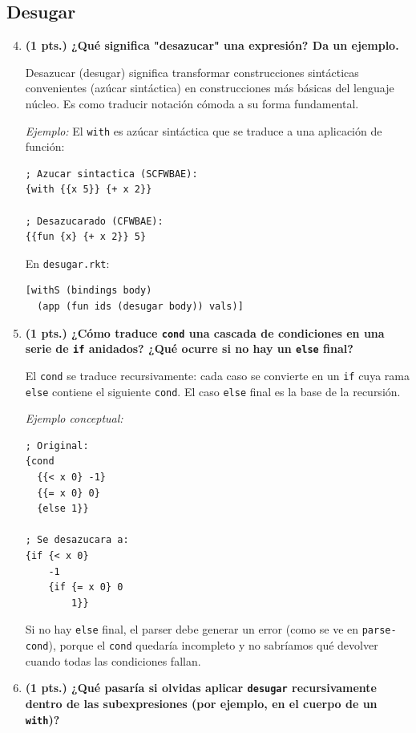 \documentclass[12pt,letterpaper]{article}
\begin{document}
\subsection{Desugar}

\begin{enumerate}
\setcounter{enumi}{3}

\item \textbf{(1 pts.) ¿Qué significa "desazucar" una expresión? Da un ejemplo.}

Desazucar (desugar) significa transformar construcciones sintácticas convenientes (azúcar sintáctica) en construcciones más básicas del lenguaje núcleo. Es como traducir notación cómoda a su forma fundamental.

\textit{Ejemplo:} El \texttt{with} es azúcar sintáctica que se traduce a una aplicación de función:

\begin{lstlisting}
; Azucar sintactica (SCFWBAE):
{with {{x 5}} {+ x 2}}

; Desazucarado (CFWBAE):
{{fun {x} {+ x 2}} 5}
\end{lstlisting}

En \texttt{desugar.rkt}:
\begin{lstlisting}
[withS (bindings body) 
  (app (fun ids (desugar body)) vals)]
\end{lstlisting}


\item \textbf{(1 pts.) ¿Cómo traduce \texttt{cond} una cascada de condiciones en una serie de \texttt{if} anidados? ¿Qué ocurre si no hay un \texttt{else} final?}

El \texttt{cond} se traduce recursivamente: cada caso se convierte en un \texttt{if} cuya rama \texttt{else} contiene el siguiente \texttt{cond}. El caso \texttt{else} final es la base de la recursión.

\textit{Ejemplo conceptual:}
\begin{lstlisting}
; Original:
{cond 
  {{< x 0} -1}
  {{= x 0} 0}
  {else 1}}

; Se desazucara a:
{if {< x 0} 
    -1
    {if {= x 0} 0
        1}}
\end{lstlisting}

Si no hay \texttt{else} final, el parser debe generar un error (como se ve en \texttt{parse-cond}), porque el \texttt{cond} quedaría incompleto y no sabríamos qué devolver cuando todas las condiciones fallan.

\item \textbf{(1 pts.) ¿Qué pasaría si olvidas aplicar \texttt{desugar} recursivamente dentro de las subexpresiones (por ejemplo, en el cuerpo de un \texttt{with})?}


\end{enumerate}
\end{document}

